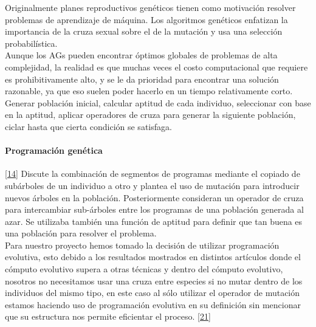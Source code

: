 			Originalmente planes reproductivos genéticos tienen como motivación resolver problemas de aprendizaje de máquina. Los algoritmos genéticos enfatizan la importancia de la cruza sexual sobre el de la mutación y usa una selección probabilística.\\
			
			Aunque los AGs pueden encontrar óptimos globales de problemas de alta complejidad, la realidad es que muchas veces el costo computacional que requiere es prohibitivamente alto, y se le da prioridad para encontrar una solución razonable, ya que eso suelen poder hacerlo en un tiempo relativamente corto.\\

			Generar población inicial, calcular aptitud de cada individuo, seleccionar con base en la aptitud, aplicar operadores de cruza para generar la siguiente población, ciclar hasta que cierta condición se satisfaga.\\

			\paragraph{Programación genética}\ref{14}
			Discute la combinación de segmentos de programas mediante el copiado de subárboles de un individuo a otro y plantea el uso de mutación para introducir nuevos árboles en la población. Posteriormente consideran un operador de cruza para intercambiar sub-árboles entre los programas de una población generada al azar. Se utilizaba también una función de aptitud para definir que tan buena es una población para resolver el problema.\\
			
		Para nuestro proyecto hemos tomado la decisión de utilizar programación evolutiva, esto debido a los resultados mostrados en distintos artículos donde el cómputo evolutivo supera a otras técnicas y dentro del cómputo evolutivo, nosotros no necesitamos usar una cruza entre especies si no mutar dentro de los individuos del mismo tipo, en este caso al sólo utilizar el operador de mutación estamos haciendo uso de programación evolutiva en su definición sin mencionar que su estructura nos permite eficientar el proceso.	\ref{21}

